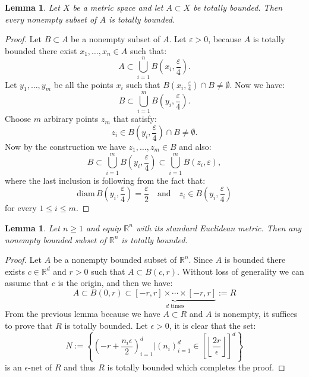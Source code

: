 \documentclass[11pt,a4paper]{article}
\theoremstyle{definition}
\theoremstyle{plain}
\newtheorem{lemma}[theorem]{Lemma}
\newcommand{\R}{\mathbb{R}}
\begin{document}
  \begin{lemma}
    Let $X$ be a metric space and let $A \subset X$ be totally bounded.
    Then every nonempty subset of $A$ is totally bounded.
  \end{lemma}
  \begin{proof}
    Let $B \subset A$ be a nonempty subset of $A$. Let $\varepsilon > 0$, 
    because $A$ is totally bounded there exist $x_1,\dots,x_n \in A$ such that:
    \[
      A \subset \bigcup_{i=1}^{n}{B\left(x_i,\frac{\varepsilon}{4}\right)}.
    \]
    Let $y_1,\dots,y_m$ be all the points $x_i$ such that 
    $B(x_i,\frac{\varepsilon}{4}) \cap B \neq \emptyset$. Now we have:
    \[
      B \subset \bigcup_{i=1}^{m}B\left(y_i,\frac{\varepsilon}{4}\right).
    \]
    Choose $m$ arbirary points $z_m$ that satisfy:
    \[
      z_i \in B\left(y_i,\frac{\varepsilon}{4}\right) \cap B \neq \emptyset.
    \]
    Now by the construction we have $z_1,\dots,z_m \in B$ and also:
    \[
      B \subset \bigcup_{i=1}^{m}B\left(y_i,\frac{\varepsilon}{4}\right) 
      \subset \bigcup_{i=1}^{m}B\left(z_i,\varepsilon\right),
    \]
    where the last inclusion is following from the fact that:
    \[
      \mathrm{diam}\, B\left(y_i,\frac{\varepsilon}{4}\right) = 
      \frac{\varepsilon}{2} \quad \text{and} \quad 
      z_i \in B\left(y_i,\frac{\varepsilon}{4}\right)
    \]
    for every $1 \le i \le m$.
  \end{proof}

  \begin{lemma}
    Let $n \geq 1$ and equip $\R^n$ with its standard Euclidean metric.
    Then any nonempty bounded subset of $\R^n$ is totally bounded.
  \end{lemma}
  \begin{proof}
    Let $A$ be a nonempty bounded subset of $\R^n$. Since $A$ is bounded
    there exists $c \in \R^d$ and $r > 0$ such that $A \subset B(c,r)$. 
    Without loss of generality we can assume that $c$ is the origin,
    and then we have:
    \[
      A \subset B(0,r) \subset 
      \underbrace{[-r,r] \times \cdots \times [-r,r]}_{d \text{ times}} :=
      R
    \]
    From the previous lemma because we have $A \subset R$ and $A$ is
    nonempty, it suffices to prove that $R$ is totally bounded. Let 
    $\epsilon > 0$, it is clear that the set:
    \[
      N := \left\{\left(-r + \frac{n_i\epsilon}{2}\right)_{i=1}^{d} 
      \biggr\vert (n_i)_{i=1}^{d} \in 
      {\left[\left\lfloor
      \frac{2r}{\epsilon}
      \right\rfloor\right]}^{d} \right\}
    \]
    is an $\epsilon$-net of $R$ and thus $R$ is totally bounded which
    completes the proof.
  \end{proof}
  
\end{document}

